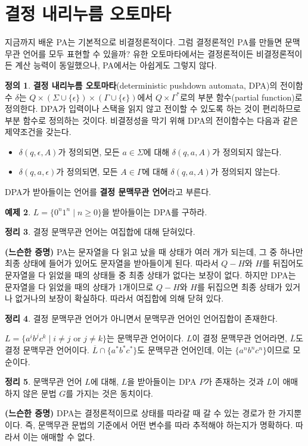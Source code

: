 \documentclass[b5paper, 11pt]{book}
\theoremstyle{definition}
\newtheorem{defn}{정의}[chapter]
\newtheorem{thm}[defn]{정리}
\newtheorem{ex}[defn]{예제}
\newenvironment{pf*}{\pushQED{\qed}\pf}
{\popQED\endpf}
\begin{document}
\section{결정 내리누름 오토마타}
지금까지 배운 PA는 기본적으로 비결정론적이다. 그럼 결정론적인 PA를 만들면 문맥무관 언어를 모두 표현할 수 있을까? 유한 오토마타에서는 결정론적이든 비결정론적이든 계산 능력이 동일했으나, PA에서는 아쉽게도 그렇지 않다. 
\begin{defn}
    \textbf{결정 내리누름 오토마타}(deterministic pushdown automata, DPA)의 전이함수 $\delta$는 $Q \times (\Sigma\cup \{\epsilon\}) \times (\Gamma \cup \{\epsilon\})$에서 $Q \times \Gamma^*$로의 부분 함수(partial function)로 정의한다. DPA가 입력이나 스택을 읽지 않고 전이할 수 있도록 하는 것이 편리하므로 부분 함수로 정의하는 것이다. 비결정성을 막기 위해 DPA의 전이함수는 다음과 같은 제약조건을 갖는다. 
\begin{itemize}
    \item $\delta(q,\epsilon,A)$가 정의되면, 모든 $a \in \Sigma$에 대해 $\delta(q,a,A)$가 정의되지 않는다.
    \item $\delta(q,a,\epsilon)$가 정의되면, 모든 $A \in \Gamma$에 대해 $\delta(q,a,A)$가 정의되지 않는다. 
\end{itemize}
DPA가 받아들이는 언어를 \textbf{결정 문맥무관 언어}라고 부른다. 
\end{defn}
\begin{ex}
    $L = \{0^n1^n \;\vert\; n \ge 0\}$을 받아들이는 DPA를 구하라. 
\end{ex}
\begin{thm}
    결정 문맥무관 언어는 여집합에 대해 닫혀있다. 
\end{thm}
\begin{pf*}
    \textbf{(느슨한 증명)} PA는 문자열을 다 읽고 났을 때 상태가 여러 개가 되는데, 그 중 하나만 최종 상태에 들어가 있어도 문자열을 받아들이게 된다. 따라서 $Q-H$와 $H$를 뒤집어도 문자열을 다 읽었을 때의 상태들 중 최종 상태가 없다는 보장이 없다. 하지만 DPA는 문자열을 다 읽었을 때의 상태가 1개이므로 $Q-H$와 $H$를 뒤집으면 최종 상태가 있거나 없거나의 보장이 확실하다. 따라서 여집합에 의해 닫혀 있다.
\end{pf*}
\begin{thm}
    결정 문맥무관 언어가 아니면서 문맥무관 언어인 언어집합이 존재한다. 
\end{thm}
\begin{pf*}
    $L = \{ a^i b^j c^k \;\vert\; i \neq j \text{ or } j \neq k \}$는 문맥무관 언어이다. $L$이 결정 문맥무관 언어라면, $\overline{L}$도 결정 문맥무관 언어이다. $\overline{L} \cap \{a^*b^*c^*\}$도 문맥무관 언어인데, 이는 $\{a^nb^nc^n\}$이므로 모순이다.
\end{pf*}
\begin{thm}
    문맥무관 언어 $L$에 대해, $L$을 받아들이는 DPA $P$가 존재하는 것과 $L$이 애매하지 않은 문법 $G$를 가지는 것은 동치이다. 
\end{thm}
\begin{pf*}
    \textbf{(느슨한 증명)} DPA는 결정론적이므로 상태를 따라갈 때 갈 수 있는 경로가 한 가지뿐이다. 즉, 문맥무관 문법의 기준에서 어떤 변수를 따라 추적해야 하는지가 명확하다. 따라서 이는 애매할 수 없다.
\end{pf*}
\end{document}
